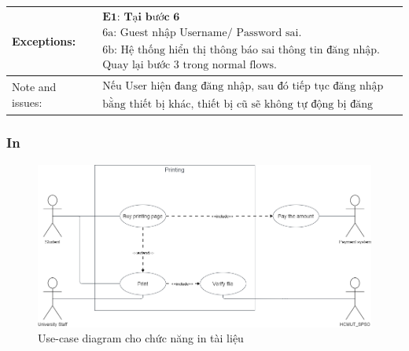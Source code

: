 \begin{tabular}{|l|l|l|l|}
\hline Exceptions: & \multicolumn{3}{|l|}{$\begin{array}{l}\textbf{E1: Tại bước 6 } \\
\text {6a: Guest nhập Username/ Password sai. } \\
\text {6b: Hệ thống hiển thị thông báo sai thông tin đăng nhập. } \\
\text {Quay lại bước 3 trong normal flows. } \end{array}$} \\
\hline Note and issues: & \multicolumn{3}{|l|}{$\begin{array}{l}
\text{Nếu User hiện đang đăng nhập, sau đó tiếp tục đăng nhập vào hệ thống } \\
\text{bằng thiết bị khác, thiết bị cũ sẽ không tự động bị đăng xuất} \end{array}$ } \\
\hline
\end{tabular}

\pagebreak
\subsubsection{In}
\begin{figure}[H]
    \begin{center}
        \includegraphics[width=1\textwidth]{Images/Requirement Elicitation/Printing_Use-case.png}
        \caption{Use-case diagram cho chức năng in tài liệu}
    \end{center}
\end{figure}

